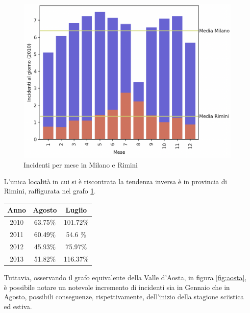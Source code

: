 \documentclass[a4paper]{report}
\begin{document}
\begin{figure}
    \includegraphics[width=\linewidth]{../src/incidenti/incidenti_senza_coords/mese_incidenti/milano_rimini.png}
    \caption{Incidenti per mese in Milano e Rimini}
    \label{fig:milano-rimini}
\end{figure}

L'unica località in cui si è riscontrata la tendenza inversa è in provincia 
di Rimini, raffigurata nel grafo \ref{fig:milano-rimini}.


\begin{center}
    \def\arraystretch{1.5}%
    \begin{tabular}{ |c|c|c| } 
    \hline
    Anno & Agosto & Luglio \\ 
    \hline
    \rowcolor{TableGray}
    2010 & 63.75\% & 101.72\% \\ 
    2011 & 60.49\% & 54.6 \%  \\
    \rowcolor{TableGray}
    2012 & 45.93\% & 75.97\%  \\
    2013 & 51.82\% & 116.37\% \\
    \hline
    \end{tabular}
\end{center}

Tuttavia, osservando il grafo equivalente della Valle d'Aosta, in figura \ref{fig:aosta}, 
è possibile notare un notevole incremento di incidenti sia in Gennaio che in Agosto, possibili 
conseguenze, rispettivamente, dell'inizio della stagione sciistica ed estiva.
\end{document}

